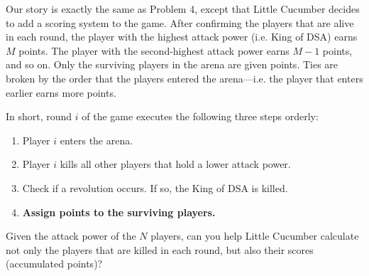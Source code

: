 
Our story is exactly the same as Problem 4, except that Little Cucumber decides to add a scoring system to the game. 
After confirming the players that are alive in each round, the player with the highest attack power (i.e. King of DSA) earns $M$ points. The player with the second-highest attack power earns $M-1$ points, and so on. Only the surviving players in the arena are given points. Ties are broken by the order that the players entered the arena---i.e. the player that enters earlier earns more points.

In short, round $i$ of the game executes the following three steps orderly:
\vspace{-6pt}
\begin{enumerate}[leftmargin=50pt]
\tightlist
    \item Player $i$ enters the arena.
    \item Player $i$ kills all other players that hold a lower attack power.
    \item Check if a revolution occurs. If so, the King of DSA is killed.
    \item \textbf{Assign points to the surviving players.}
\end{enumerate}


\noindent Given the attack power of the $N$ players, can you help Little Cucumber calculate not only the players that are killed in each round, but also their scores (accumulated points)?


